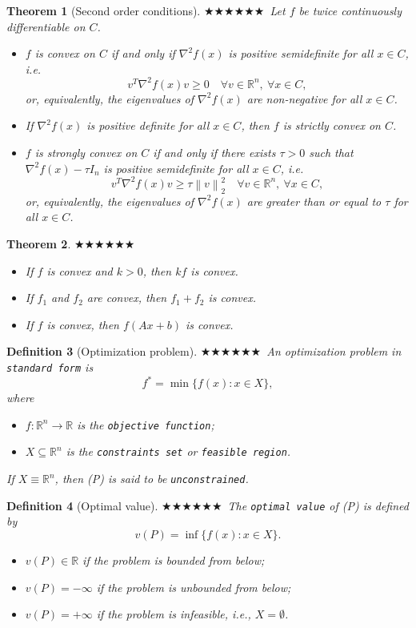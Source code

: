 \documentclass[11pt,a4paper]{article}
\newcommand{\g}{\texttt}
\newcommand{\R}{\mathbb{R}}
\newcommand{\norm}[1]{\left\lVert #1 \right\rVert}
\theoremstyle{breakdef}
\newtheorem{definition}{Definition}[section]
\theoremstyle{breakplain}
\newtheorem{theorem}[definition]{Theorem}
\theoremstyle{remark}
\newcommand{\imp}[1]{\textcolor{impcolor}{%
  \ifcase#1\or$\bigstar$\or$\bigstar\bigstar$\or$\bigstar\bigstar\bigstar$\fi}\ }
\begin{document}
\begin{theorem}[Second order conditions]
\imp{3}Let $f$ be twice continuously differentiable on $C$.
\begin{itemize}
    \item $f$ is convex on $C$ if and only if $\nabla^2 f(x)$ is positive semidefinite for all $x \in C$, i.e.
    \[
        v^T \nabla^2 f(x) v \ge 0 \quad \forall v \in \R^n,\ \forall x \in C,
    \]
    or, equivalently, the eigenvalues of $\nabla^2 f(x)$ are non-negative for all $x \in C$.
    \item If $\nabla^2 f(x)$ is positive definite for all $x \in C$, then $f$ is strictly convex on $C$.
    \item $f$ is strongly convex on $C$ if and only if there exists $\tau > 0$ such that $\nabla^2 f(x) - \tau I_n$ is positive semidefinite for all $x \in C$, i.e.
    \[
        v^T \nabla^2 f(x) v \ge \tau\norm{v}_2^2 \quad \forall v \in \R^n,\ \forall x \in C,
    \]
    or, equivalently, the eigenvalues of $\nabla^2 f(x)$ are greater than or equal to $\tau$ for all $x \in C$.
\end{itemize}
\end{theorem}

\begin{theorem}
\imp{3}\leavevmode
\begin{itemize}
    \item If $f$ is convex and $k > 0$, then $kf$ is convex.
    \item If $f_1$ and $f_2$ are convex, then $f_1 + f_2$ is convex.
    \item If $f$ is convex, then $f(Ax + b)$ is convex.
\end{itemize}
\end{theorem}

\begin{definition}[Optimization problem]
\imp{2}An optimization problem in \g{standard form} is
\[
    f^* = \min \{ f(x) : x \in X \}, \tag{P}
\]
where
\begin{itemize}
    \item $f: \R^n \to \R$ is the \g{objective function};
    \item $X \subseteq \R^n$ is the \g{constraints set} or \g{feasible region}.
\end{itemize}
If $X \equiv \R^n$, then (P) is said to be \g{unconstrained}.
\end{definition}

\begin{definition}[Optimal value]
\imp{2}The \g{optimal value} of (P) is defined by
\[
    v(P) = \inf\{f(x) : x \in X\}.
\]
\begin{itemize}
    \item $v(P) \in \R$ if the problem is bounded from below;
    \item $v(P) = -\infty$ if the problem is unbounded from below;
    \item $v(P) = +\infty$ if the problem is infeasible, i.e., $X = \emptyset$.
\end{itemize}
\end{definition}
\end{document}
